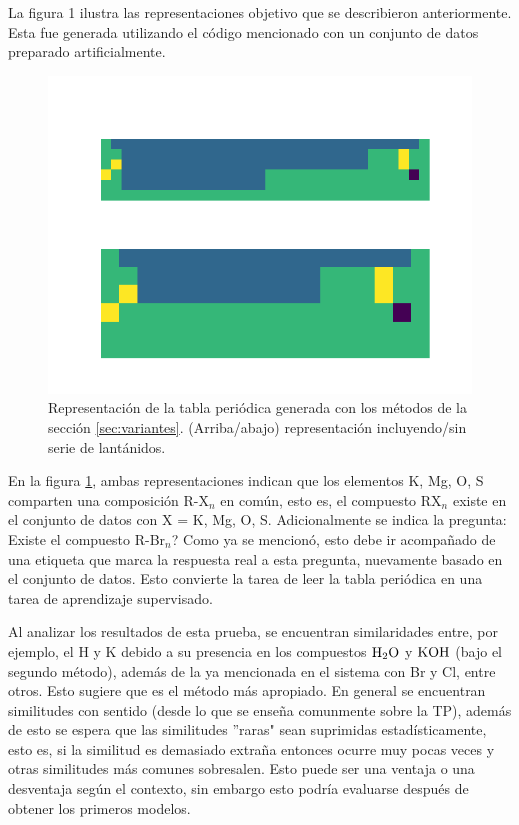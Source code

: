 \documentclass[twoside,twocolumn]{article}
\begin{document}
La figura 1 ilustra las representaciones objetivo que se describieron anteriormente. Esta fue generada utilizando el c\'odigo mencionado con un conjunto de datos preparado artificialmente. 

\begin{figure}[h!]
	\includegraphics[width=\linewidth]{ex1TPR.png}
	\caption{Representaci\'on de la tabla peri\'odica generada con los m\'etodos de la secci\'on \ref{sec:variantes}. (Arriba/abajo) representaci\'on incluyendo/sin serie de lant\'anidos.}
	\label{fig:fig1}
\end{figure}

En la figura \ref{fig:fig1}, ambas representaciones indican que los elementos K, Mg, O, S comparten una composici\'on R-X$_n$ en com\'un, esto es, el compuesto RX$_n$ existe en el conjunto de datos con X = K, Mg, O, S. Adicionalmente se indica la pregunta: Existe el compuesto R-Br$_n$? Como ya se mencion\'o, esto debe ir acompa\~nado de una etiqueta que marca la respuesta real a esta pregunta, nuevamente basado en el conjunto de datos. Esto convierte la tarea de leer la tabla peri\'odica en una tarea de aprendizaje supervisado.

Al analizar los resultados de esta prueba, se encuentran similaridades entre, por ejemplo, el H y K debido a su presencia en los compuestos $\ce{H2O}$ y $\ce{KOH}$ (bajo el segundo m\'etodo), adem\'as de la ya mencionada en el sistema con Br y Cl, entre otros. Esto sugiere que es el m\'etodo m\'as apropiado. En general se encuentran similitudes con sentido (desde lo que se ense\~na comunmente sobre la TP), adem\'as de esto se espera que las similitudes ''raras" sean suprimidas estad\'isticamente, esto es, si la similitud es demasiado extra\~na entonces ocurre muy pocas veces y otras similitudes m\'as comunes sobresalen.
Esto puede ser una ventaja o una desventaja seg\'un el contexto, sin embargo esto podr\'ia evaluarse despu\'es de obtener los primeros modelos.
\end{document}
